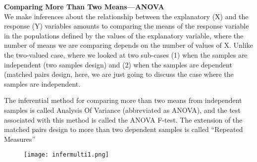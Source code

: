 \documentclass[10pt, a4paper]{article}
\begin{document}
\textbf{Comparing More Than Two Means---ANOVA}\\
We make inferences about the relationship between the explanatory (X) and the response (Y) variables amounts to comparing the means of the response variable in the populations defined by the values of the explanatory variable, where the number of means we are comparing depends on the number of values of X. Unlike the two-valued case, where we looked at two sub-cases (1) when the samples are independent (two samples design) and (2) when the samples are dependent (matched pairs design, here, we are just going to discuss the case where the samples are independent.\par 
The inferential method for comparing more than two means from independent samples is called Analysis Of Variance (abbreviated as ANOVA), and the test associated with this method is called the ANOVA F-test.
The extension of the matched pairs design to more than two dependent samples is called ``Repeated Measures''\par
\begin{figure}
[h!]
\centering
\texttt{[image: infermulti1.png]}
\end{figure}
\end{document}
